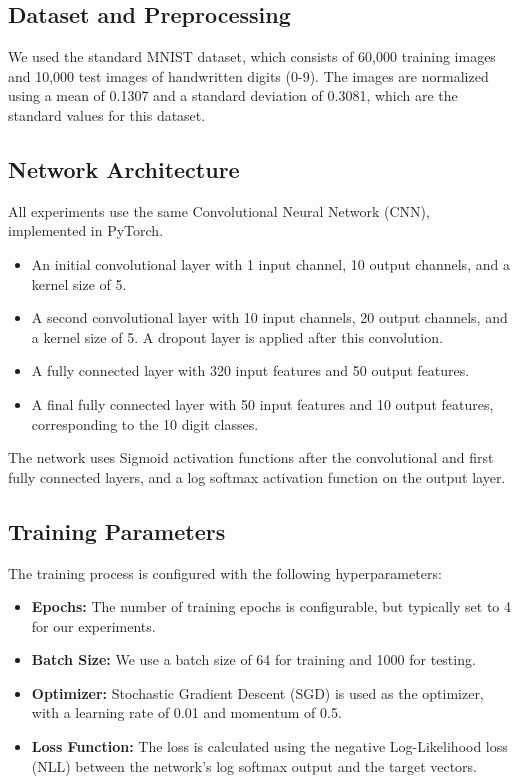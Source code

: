 \documentclass[12pt,fleqn,a4paper]{article}
\begin{document}
 \subsection{Dataset and Preprocessing}
 We used the standard MNIST dataset, which consists of 60,000 training images and 10,000 test images of handwritten digits (0-9). The images are normalized using a mean of 0.1307 and a standard deviation of 0.3081, which are the standard values for this dataset.

 \subsection{Network Architecture}
All experiments use the same Convolutional Neural Network (CNN), implemented in PyTorch.

 \begin{itemize}
     \item An initial convolutional layer with 1 input channel, 10 output channels, and a kernel size of 5.
     \item A second convolutional layer with 10 input channels, 20 output channels, and a kernel size of 5. A dropout layer is applied after this convolution.
     \item A fully connected layer with 320 input features and 50 output features.
     \item A final fully connected layer with 50 input features and 10 output features, corresponding to the 10 digit classes.
 \end{itemize}
 The network uses Sigmoid activation functions after the convolutional and first fully connected layers, and a log softmax activation function on the output layer.

 \subsection{Training Parameters}
 The training process is configured with the following hyperparameters:
 \begin{itemize}
     \item \textbf{Epochs:} The number of training epochs is configurable, but typically set to 4 for our experiments.
     \item \textbf{Batch Size:} We use a batch size of 64 for training and 1000 for testing.
     \item \textbf{Optimizer:} Stochastic Gradient Descent (SGD) is used as the optimizer, with a learning rate of 0.01 and momentum of 0.5.
     \item \textbf{Loss Function:} The loss is calculated using the negative Log-Likelihood loss (NLL) between the network's log softmax output and the target vectors.
 \end{itemize}
\end{document}
